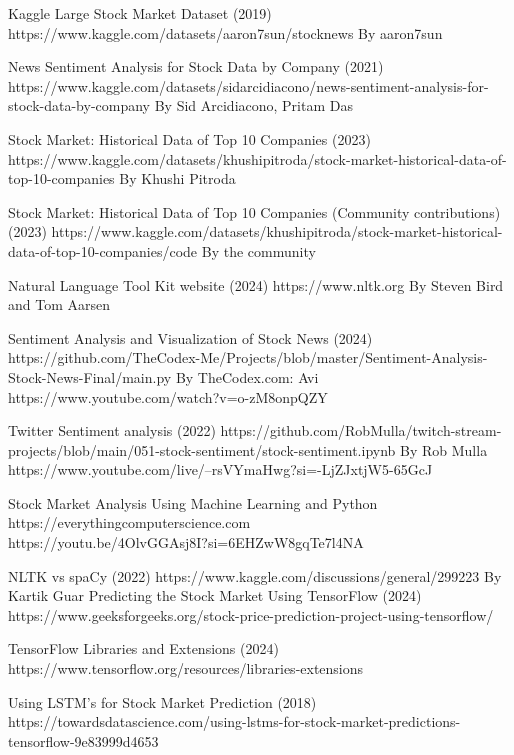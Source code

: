 \documentclass[11pt, a4paper]{article}
\begin{document}
\newpage
\begin{thebibliography}{9}


Kaggle Large Stock Market Dataset (2019)
https://www.kaggle.com/datasets/aaron7sun/stocknews
By aaron7sun


News Sentiment Analysis for Stock Data by Company (2021)
https://www.kaggle.com/datasets/sidarcidiacono/news-sentiment-analysis-for-stock-data-by-company
By Sid Arcidiacono, Pritam Das

Stock Market: Historical Data of Top 10 Companies (2023)
https://www.kaggle.com/datasets/khushipitroda/stock-market-historical-data-of-top-10-companies
By Khushi Pitroda 

Stock Market: Historical Data of Top 10 Companies (Community contributions) (2023)
https://www.kaggle.com/datasets/khushipitroda/stock-market-historical-data-of-top-10-companies/code
By the community

Natural Language Tool Kit website (2024)
https://www.nltk.org
By Steven Bird and Tom Aarsen

Sentiment Analysis and Visualization of Stock News (2024)
https://github.com/TheCodex-Me/Projects/blob/master/Sentiment-Analysis-Stock-News-Final/main.py
By TheCodex.com: Avi
https://www.youtube.com/watch?v=o-zM8onpQZY

Twitter Sentiment analysis (2022)
https://github.com/RobMulla/twitch-stream-projects/blob/main/051-stock-sentiment/stock-sentiment.ipynb
By Rob Mulla
https://www.youtube.com/live/--rsVYmaHwg?si=-LjZJxtjW5-65GcJ

Stock Market Analysis Using Machine Learning and Python
\\https://everythingcomputerscience.com
\\https://youtu.be/4OlvGGAsj8I?si=6EHZwW8gqTe7l4NA


NLTK vs spaCy  (2022)
https://www.kaggle.com/discussions/general/299223
By Kartik Guar
Predicting the Stock Market Using TensorFlow (2024)
https://www.geeksforgeeks.org/stock-price-prediction-project-using-tensorflow/

TensorFlow Libraries and Extensions (2024)
https://www.tensorflow.org/resources/libraries-extensions

Using LSTM's for Stock Market Prediction (2018)
https://towardsdatascience.com/using-lstms-for-stock-market-predictions-tensorflow-9e83999d4653


\end{thebibliography}
\end{document}
